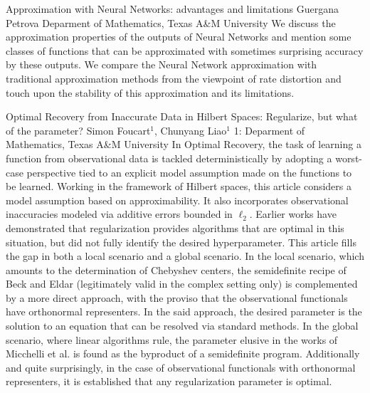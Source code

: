 \vspace{1.5ex}
\abs
{Approximation with Neural Networks: advantages and limitations}
{Guergana Petrova}
{Deparment of Mathematics, Texas A\&M University}
{We discuss  the approximation properties of the outputs of Neural Networks and mention some classes of functions  that can be approximated with sometimes surprising accuracy by these outputs. We compare the Neural Network approximation  with traditional approximation methods from the viewpoint of rate distortion and touch upon the stability of this approximation and its limitations.}


\vspace{1.5ex}
\abs
{Optimal Recovery from Inaccurate Data in Hilbert Spaces: Regularize, but what of the parameter?}
{Simon Foucart$^1$, Chunyang Liao$^1$}
{1: Deparment of Mathematics, Texas A\&M University}
{In Optimal Recovery, the task of learning a function from observational data is tackled deterministically by adopting a worst-case perspective tied to an explicit model assumption made on the functions to be learned. Working in the framework of Hilbert spaces, this article considers a model assumption based on approximability. It also incorporates observational inaccuracies modeled via additive errors bounded in $\ell_2$. Earlier works have demonstrated that regularization provides algorithms that are optimal in this situation, but did not fully identify the desired hyperparameter. This article fills the gap in both a local scenario and a global scenario. In the local scenario, which amounts to the determination of Chebyshev centers, the semidefinite recipe of Beck and Eldar (legitimately valid in the complex setting only) is complemented by a more direct approach, with the proviso that the observational functionals have orthonormal representers. In the said approach, the desired parameter is the solution to an equation that can be resolved via standard methods. In the global scenario, where linear algorithms rule, the parameter elusive in the works of Micchelli et al. is found as the byproduct of a semidefinite program. Additionally and quite surprisingly, in the case of observational functionals with orthonormal representers, it is established that any regularization parameter is optimal.}


